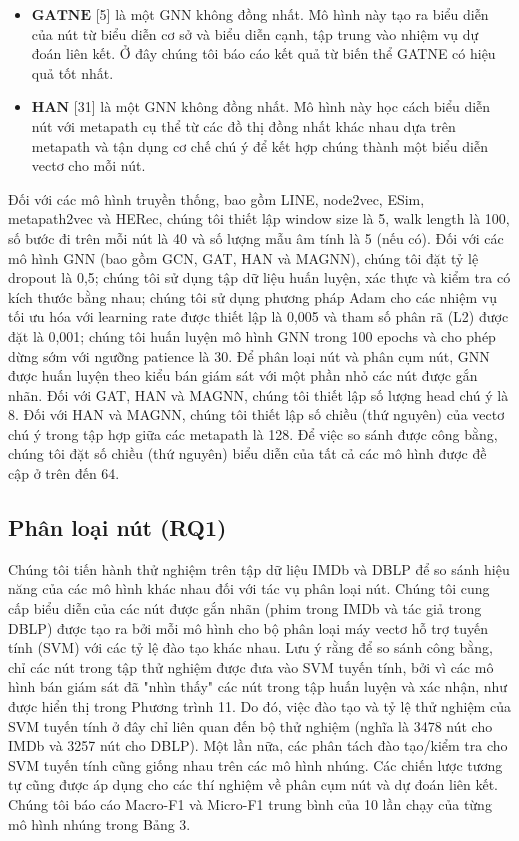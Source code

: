 \begin{itemize}
  \item $\mathbf{GATNE}$ [5] là một GNN không đồng nhất. Mô hình này tạo ra biểu diễn của nút từ biểu diễn cơ sở và biểu diễn cạnh, tập trung vào nhiệm vụ dự đoán liên kết. Ở đây chúng tôi báo cáo kết quả từ biến thể GATNE có hiệu quả tốt nhất.
  \item $\mathbf{HAN}$ [31] là một GNN không đồng nhất. Mô hình này học cách biểu diễn nút với metapath cụ thể từ các đồ thị đồng nhất khác nhau dựa trên metapath và tận dụng cơ chế chú ý để kết hợp chúng thành một biểu diễn vectơ cho mỗi nút.
\end{itemize}

Đối với các mô hình truyền thống, bao gồm LINE, node2vec, ESim, metapath2vec và HERec, chúng tôi thiết lập window size là 5, walk length là 100, số bước đi trên mỗi nút là 40 và số lượng mẫu âm tính là 5 (nếu có). Đối với các mô hình GNN (bao gồm GCN, GAT, HAN và MAGNN), chúng tôi đặt tỷ lệ dropout là 0,5; chúng tôi sử dụng tập dữ liệu huấn luyện, xác thực và kiểm tra có kích thước bằng nhau; chúng tôi sử dụng phương pháp Adam cho các nhiệm vụ tối ưu hóa với learning rate được thiết lập là 0,005 và tham số phân rã (L2) được đặt là 0,001; chúng tôi huấn luyện mô hình GNN trong 100 epochs và cho phép dừng sớm với ngưỡng patience là 30. Để phân loại nút và phân cụm nút, GNN được huấn luyện theo kiểu bán giám sát với một phần nhỏ các nút được gắn nhãn. Đối với GAT, HAN và MAGNN, chúng tôi thiết lập số lượng head chú ý là 8. Đối với HAN và MAGNN, chúng tôi thiết lập số chiều (thứ nguyên) của vectơ chú ý trong tập hợp giữa các metapath là 128. Để việc so sánh được công bằng, chúng tôi đặt số chiều (thứ nguyên) biểu diễn của tất cả các mô hình được đề cập ở trên đến 64.

\subsection{Phân loại nút (RQ1)}
Chúng tôi tiến hành thử nghiệm trên  tập dữ liệu IMDb và DBLP để so sánh hiệu năng của các mô hình khác nhau đối với tác vụ phân loại nút. Chúng tôi cung cấp biểu diễn của các nút được gắn nhãn (phim trong IMDb và tác giả trong DBLP) được tạo ra bởi mỗi mô hình cho bộ phân loại máy vectơ hỗ trợ tuyến tính (SVM) với các tỷ lệ đào tạo khác nhau. Lưu ý rằng để so sánh công bằng, chỉ các nút trong tập thử nghiệm được đưa vào SVM tuyến tính, bởi vì các mô hình bán giám sát đã "nhìn thấy" các nút trong tập huấn luyện và xác nhận, như được hiển thị trong Phương trình 11. Do đó, việc đào tạo và tỷ lệ thử nghiệm của SVM tuyến tính ở đây chỉ liên quan đến bộ thử nghiệm (nghĩa là 3478 nút cho IMDb và 3257 nút cho DBLP). Một lần nữa, các phân tách đào tạo/kiểm tra cho SVM tuyến tính cũng giống nhau trên các mô hình nhúng. Các chiến lược tương tự cũng được áp dụng cho các thí nghiệm về phân cụm nút và dự đoán liên kết. Chúng tôi báo cáo Macro-F1 và Micro-F1 trung bình của 10 lần chạy của từng mô hình nhúng trong Bảng 3.

